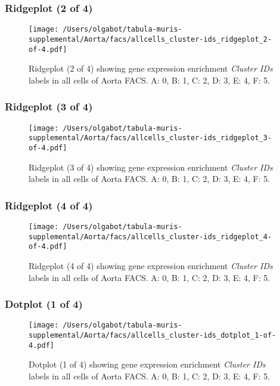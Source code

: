 \clearpage

\subsubsection{Ridgeplot (2 of 4)}
\begin{figure}[h]
\centering
\texttt{[image: /Users/olgabot/tabula-muris-supplemental/Aorta/facs/allcells\_cluster-ids\_ridgeplot\_2-of-4.pdf]}

\caption{ Ridgeplot (2 of 4)  showing gene expression enrichment \emph{Cluster IDs} labels in all cells of Aorta FACS. A: 0, B: 1, C: 2, D: 3, E: 4, F: 5.}
\end{figure}


\clearpage

\subsubsection{Ridgeplot (3 of 4)}
\begin{figure}[h]
\centering
\texttt{[image: /Users/olgabot/tabula-muris-supplemental/Aorta/facs/allcells\_cluster-ids\_ridgeplot\_3-of-4.pdf]}

\caption{ Ridgeplot (3 of 4)  showing gene expression enrichment \emph{Cluster IDs} labels in all cells of Aorta FACS. A: 0, B: 1, C: 2, D: 3, E: 4, F: 5.}
\end{figure}


\clearpage

\subsubsection{Ridgeplot (4 of 4)}
\begin{figure}[h]
\centering
\texttt{[image: /Users/olgabot/tabula-muris-supplemental/Aorta/facs/allcells\_cluster-ids\_ridgeplot\_4-of-4.pdf]}

\caption{ Ridgeplot (4 of 4)  showing gene expression enrichment \emph{Cluster IDs} labels in all cells of Aorta FACS. A: 0, B: 1, C: 2, D: 3, E: 4, F: 5.}
\end{figure}


\clearpage

\subsubsection{Dotplot (1 of 4)}
\begin{figure}[h]
\centering
\texttt{[image: /Users/olgabot/tabula-muris-supplemental/Aorta/facs/allcells\_cluster-ids\_dotplot\_1-of-4.pdf]}

\caption{ Dotplot (1 of 4)  showing gene expression enrichment \emph{Cluster IDs} labels in all cells of Aorta FACS. A: 0, B: 1, C: 2, D: 3, E: 4, F: 5.}
\end{figure}


